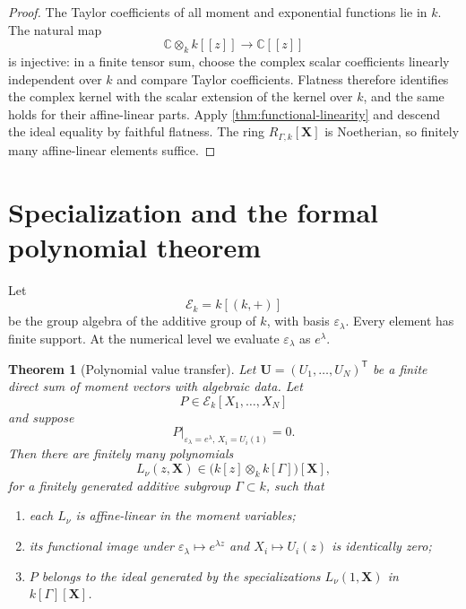 \documentclass[11pt]{article}
\numberwithin{equation}{section}
\newtheorem{theorem}{Theorem}[section]
\theoremstyle{definition}
\theoremstyle{remark}
\newcommand{\C}{\mathbb C}
\begin{document}
\begin{proof}
The Taylor coefficients of all moment and exponential functions lie in
$k$.  The natural map
\[
  \C\otimes_k k[[z]]\longrightarrow\C[[z]]
\]
is injective: in a finite tensor sum, choose the complex scalar coefficients
linearly independent over $k$ and compare Taylor coefficients.  Flatness
therefore identifies the complex kernel with the scalar extension of the
kernel over $k$, and the same holds for their affine-linear parts.  Apply
\cref{thm:functional-linearity} and descend the ideal equality by faithful
flatness.  The ring $R_{\Gamma,k}[\mathbf X]$ is Noetherian, so finitely many
affine-linear elements suffice.
\end{proof}

\section{Specialization and the formal polynomial theorem}
\label{sec:specialization}

Let
\[
  \mathscr E_k=k[(k,+)]
\]
be the group algebra of the additive group of $k$, with basis
$\varepsilon_\lambda$.  Every element has finite support.  At the numerical
level we evaluate $\varepsilon_\lambda$ as $e^\lambda$.

\begin{theorem}[Polynomial value transfer]\label{thm:value-transfer}
Let $\mathbf U=(U_1,\ldots,U_N)^{\mathsf T}$ be a finite direct sum of moment
vectors with algebraic data.  Let
\[
  P\in\mathscr E_k[X_1,\ldots,X_N]
\]
and suppose
\begin{equation}\label{eq:value-relation}
  P\big|_{\varepsilon_\lambda=e^\lambda,\,
          X_i=U_i(1)}=0.
\end{equation}
Then there are finitely many polynomials
\begin{equation}\label{eq:linear-functional-generators}
  L_\nu(z,\mathbf X)
  \in\bigl(k[z]\otimes_k k[\Gamma]\bigr)[\mathbf X],
\end{equation}
for a finitely generated additive subgroup $\Gamma\subset k$, such that
\begin{enumerate}[label=\textup{(\roman*)},leftmargin=2.4em]
\item each $L_\nu$ is affine-linear in the moment variables;
\item its functional image under
$\varepsilon_\lambda\mapsto e^{\lambda z}$ and
$X_i\mapsto U_i(z)$ is identically zero;
\item $P$ belongs to the ideal generated by the specializations
$L_\nu(1,\mathbf X)$ in $k[\Gamma][\mathbf X]$.
\end{enumerate}
\end{theorem}
\end{document}
